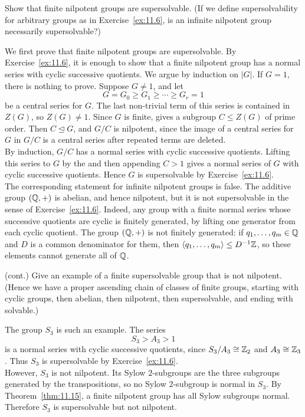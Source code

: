 \documentclass[../Odyssey_Project.tex]{subfiles}
\begin{document}
\begin{exercise}
\label{ex:11.7}
Show that finite nilpotent groups are supersolvable. (If we define supersolvability for arbitrary groups as in Exercise~\ref{ex:11.6}, is an infinite nilpotent group necessarily supersolvable?)
\end{exercise}
\begin{solution}
    We first prove that finite nilpotent groups are supersolvable. By Exercise~\ref{ex:11.6}, it is enough to show that a finite nilpotent group has a normal series with cyclic successive quotients. We argue by induction on $\lvert G\rvert$. If $G=1$, there is nothing to prove. Suppose $G\neq 1$, and let
    \[
        G=G_0\geq G_1\geq \cdots \geq G_r=1
    \]
    be a central series for $G$. The last non-trivial term of this series is contained in $Z(G)$, so $Z(G)\neq 1$. Since $G$ is finite,  gives a subgroup $C\leq Z(G)$ of prime order. Then $C\trianglelefteq G$, and $G/C$ is nilpotent, since the image of a central series for $G$ in $G/C$ is a central series after repeated terms are deleted.\\
    By induction, $G/C$ has a normal series with cyclic successive quotients. Lifting this series to $G$ by the  and then appending $C>1$ gives a normal series of $G$ with cyclic successive quotients. Hence $G$ is supersolvable by Exercise~\ref{ex:11.6}.\\
    The corresponding statement for infinite nilpotent groups is false. The additive group $(\mathbb{Q},+)$ is abelian, and hence nilpotent, but it is not supersolvable in the sense of Exercise~\ref{ex:11.6}. Indeed, any group with a finite normal series whose successive quotients are cyclic is finitely generated, by lifting one generator from each cyclic quotient. The group $(\mathbb{Q},+)$ is not finitely generated: if $q_1,\ldots,q_m\in\mathbb{Q}$ and $D$ is a common denominator for them, then $\langle q_1,\ldots,q_m\rangle\leq D^{-1}\mathbb{Z}$, so these elements cannot generate all of $\mathbb{Q}$.
\end{solution}

\begin{exercise}
\label{ex:11.8}
(cont.) Give an example of a finite supersolvable group that is not nilpotent. (Hence we have a proper ascending chain of classes of finite groups, starting with cyclic groups, then abelian, then nilpotent, then supersolvable, and ending with solvable.)
\end{exercise}
\begin{solution}
    The group $S_3$ is such an example. The series
    \[
        S_3>A_3>1
    \]
    is a normal series with cyclic successive quotients, since $S_3/A_3\cong \mathbb{Z}_2$ and $A_3\cong \mathbb{Z}_3$. Thus $S_3$ is supersolvable by Exercise~\ref{ex:11.6}.\\
    However, $S_3$ is not nilpotent. Its Sylow $2$-subgroups are the three subgroups generated by the transpositions, so no Sylow $2$-subgroup is normal in $S_3$. By Theorem~\ref{thm:11.15}, a finite nilpotent group has all Sylow subgroups normal. Therefore $S_3$ is supersolvable but not nilpotent.
\end{solution}
\end{document}

